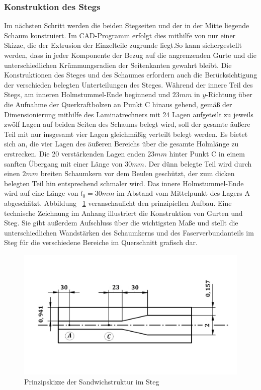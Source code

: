 \subsubsection{Konstruktion des Stegs}
\noindent Im nächsten Schritt werden die beiden Stegseiten und der in der Mitte liegende Schaum konstruiert. Im CAD-Programm erfolgt dies mithilfe von nur einer Skizze, die der Extrusion der Einzelteile zugrunde liegt.So kann sichergestellt werden, dass in jeder Komponente der Bezug auf die angrenzenden Gurte und die unterschiedlichen Krümmungsradien der Seitenkanten gewahrt bleibt. Die Konstruktionen des Steges und des Schaumes erfordern auch die Berücksichtigung der verschieden belegten Unterteilungen des Steges. Während der innere Teil des Stegs, am inneren Holmstummel-Ende beginnend und $ 23mm $ in $y$-Richtung über die Aufnahme der Querkraftbolzen an Punkt C hinaus gehend, gemäß der Dimensionierung mithilfe des Laminatrechners mit 24 Lagen aufgeteilt zu jeweils zwölf Lagen auf beiden Seiten des Schaums belegt wird, soll der gesamte äußere Teil mit nur insgesamt vier Lagen gleichmäßig verteilt belegt werden. Es bietet sich an, die vier Lagen des äußeren Bereichs über die gesamte Holmlänge zu erstrecken. Die 20 verstärkenden Lagen enden $ 23mm $ hinter Punkt C in einem sanften Übergang mit einer Länge von $ 30mm $. Der dünn belegte Teil wird durch einen $ 2mm $ breiten Schaumkern vor dem Beulen geschützt, der zum dicken belegten Teil hin entsprechend schmaler wird. Das innere Holmstummel-Ende wird auf eine Länge von $ l_{0}=30mm $ im Abstand vom Mittelpunkt des Lagers A abgeschätzt. Abbildung ~\ref{fig: Steg} veranschaulicht den prinzipiellen Aufbau. Eine technische Zeichnung im Anhang illustriert die Konstruktion von Gurten und Steg. Sie gibt außerdem Aufschluss über die wichtigsten Maße und stellt die unterschiedlichen Wandstärken des Schaumkerns und des Faserverbundanteils im Steg für die verschiedene Bereiche im Querschnitt grafisch dar.

\begin{figure}[h]
	\includegraphics[width=1.0\textwidth]{Bilder/StegPrinzip.jpg}
	\caption{Prinzipskizze der Sandwichstruktur im Steg}
	\label{fig: Steg}
\end{figure}


